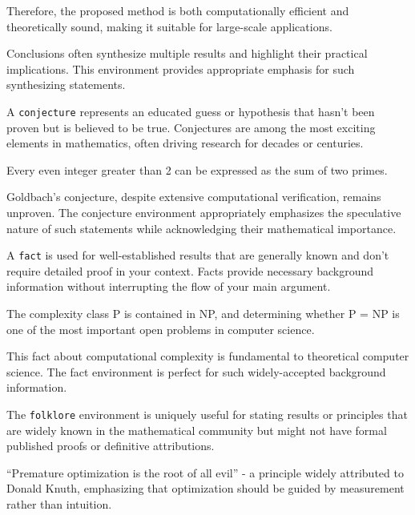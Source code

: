 \documentclass[9pt]{amsart}
\begin{document}
\begin{conclusion}
	Therefore, the proposed method is both computationally efficient and theoretically sound, making it suitable for large-scale applications.
\end{conclusion}

Conclusions often synthesize multiple results and highlight their practical
implications. This environment provides appropriate emphasis for such
synthesizing statements.

A \texttt{conjecture} represents an educated guess or hypothesis that hasn't
been proven but is believed to be true. Conjectures are among the most exciting
elements in mathematics, often driving research for decades or centuries.

\begin{conjecture}
	Every even integer greater than 2 can be expressed as the sum of two primes.
\end{conjecture}

Goldbach's conjecture, despite extensive computational verification, remains
unproven. The conjecture environment appropriately emphasizes the speculative
nature of such statements while acknowledging their mathematical importance.

A \texttt{fact} is used for well-established results that are generally known
and don't require detailed proof in your context. Facts provide necessary
background information without interrupting the flow of your main argument.

\begin{fact}
	The complexity class P is contained in NP, and determining whether P = NP is one of the most important open problems in computer science.
\end{fact}

This fact about computational complexity is fundamental to theoretical computer
science. The fact environment is perfect for such widely-accepted background
information.

The \texttt{folklore} environment is uniquely useful for stating results or
principles that are widely known in the mathematical community but might not
have formal published proofs or definitive attributions.

\begin{folklore}
	``Premature optimization is the root of all evil'' - a principle widely attributed to Donald Knuth, emphasizing that optimization should be guided by measurement rather than intuition.
\end{folklore}
\end{document}
